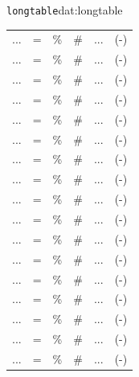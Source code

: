 \begin{dateifenster}{\texttt{longtable}}{dat:longtable}
\begin{longtable}{@{}p{2cm}@{\ }l@{\ }p{1.5cm}l@{\ }p{5cm}p{3cm}@{}}
		...                            & =                                & \%      & \# & ...          & (-) \\
		...                            & =                                & \%      & \# & ...          & (-) \\
		...                            & =                                & \%      & \# & ...          & (-) \\
		...                            & =                                & \%      & \# & ...          & (-) \\
		...                            & =                                & \%      & \# & ...          & (-) \\
		...                            & =                                & \%      & \# & ...          & (-) \\
		...                            & =                                & \%      & \# & ...          & (-) \\
		...                            & =                                & \%      & \# & ...          & (-) \\
		...                            & =                                & \%      & \# & ...          & (-) \\
		...                            & =                                & \%      & \# & ...          & (-) \\
		...                            & =                                & \%      & \# & ...          & (-) \\
		...                            & =                                & \%      & \# & ...          & (-) \\
		...                            & =                                & \%      & \# & ...          & (-) \\
		...                            & =                                & \%      & \# & ...          & (-) \\
		...                            & =                                & \%      & \# & ...          & (-) \\
		...                            & =                                & \%      & \# & ...          & (-) \\
		...                            & =                                & \%      & \# & ...          & (-)
	\end{longtable}
\end{dateifenster}